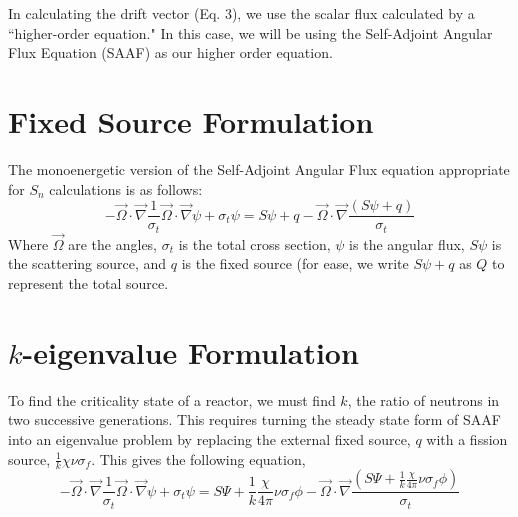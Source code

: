 In calculating the drift vector (Eq. 3), we use the scalar flux calculated by a ``higher-order equation." In this case, we will be using the Self-Adjoint Angular Flux Equation (SAAF) \cite{saaf} as our higher order equation. 

\section{Fixed Source Formulation}
The monoenergetic version of the Self-Adjoint Angular Flux equation appropriate for $S_n$ calculations is as follows:
\begin{equation}
    - \vec{\Omega} \cdot \vec{\nabla}\frac{1}{\sigma_t}\vec{\Omega} \cdot \vec{\nabla} \psi + \sigma_t \psi = S\psi + q - \vec{\Omega} \cdot \vec{\nabla} \frac{(S\psi + q)}{\sigma_t}
    \label{eq:SAAF}
\end{equation}
Where $\vec{\Omega}$ are the angles, $\sigma_t$ is the total cross section, $\psi$ is the angular flux, $S\psi$ is the scattering source, and $q$ is the fixed source (for ease, we write $S\psi + q$ as $Q$ to represent the total source.

\section{$k$-eigenvalue Formulation}
To find the criticality state of a reactor, we must find $k$, the ratio of neutrons in two successive generations.  This requires turning the steady state form of SAAF into an eigenvalue problem by replacing the external fixed source, $q$ with a fission source, $\frac{1}{k}\chi\nu \sigma_f$. This gives the following equation,
\begin{equation}
        - \vec{\Omega} \cdot \vec{\nabla}\frac{1}{\sigma_t}\vec{\Omega} \cdot \vec{\nabla} \psi + \sigma_t \psi = S\Psi + \frac{1}{k}\frac{\chi}{4\pi}\nu\sigma_f\phi - \vec{\Omega} \cdot \vec{\nabla} \frac{(S\Psi + \frac{1}{k}\frac{\chi}{4\pi}\nu\sigma_f\phi)}{\sigma_t}
    \label{eq:SAAF-eigenvalue}
\end{equation}